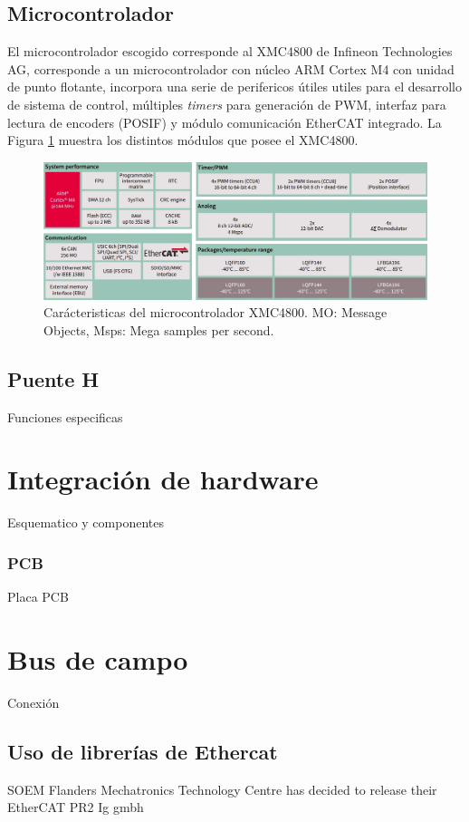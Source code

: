 \subsection{Microcontrolador}

El microcontrolador escogido corresponde al XMC4800 de Infineon Technologies AG, corresponde a un microcontrolador con núcleo ARM Cortex M4 con unidad de punto flotante, incorpora una serie de perifericos útiles utiles para el desarrollo de sistema de control, múltiples \textit{timers} para generación de PWM, interfaz para lectura de encoders (POSIF) y módulo comunicación EtherCAT integrado. La Figura \ref{cap3_xmc4800_data} muestra los distintos módulos que posee el XMC4800.

\begin{figure}[ht]
  \centering
  \includegraphics[scale=.2]{img/cap3/xmc4800_data}
  \caption{Carácteristicas del microcontrolador XMC4800. MO: Message Objects, Msps: Mega samples per second.}
  \label{cap3_xmc4800_data}
\end{figure}

\subsection{Puente H}

Funciones especificas

\section{Integración de hardware}

Esquematico y componentes

\subsubsection{PCB}

Placa PCB

\section{Bus de campo}

Conexión

\subsection{Uso de librerías de Ethercat}

SOEM
Flanders Mechatronics Technology Centre has decided to release their EtherCAT PR2
Ig gmbh

